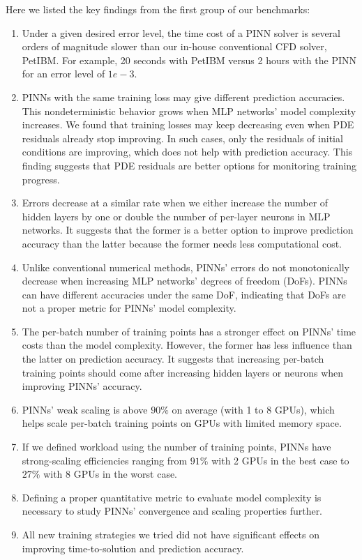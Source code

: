 {Here we listed the key findings from the first group of our benchmarks:
\begin{enumerate}[nolistsep]
    \item Under a given desired error level, the time cost of a PINN solver is several orders of magnitude slower than our in-house conventional CFD solver, PetIBM.
    For example, 20 seconds with PetIBM versus 2 hours with the PINN for an error level of $1e-3$.
    \item PINNs with the same training loss may give different prediction accuracies.
    This nondeterministic behavior grows when MLP networks' model complexity increases.
    We found that training losses may keep decreasing even when PDE residuals already stop improving.
    In such cases, only the residuals of initial conditions are improving, which does not help with prediction accuracy.
    This finding suggests that PDE residuals are better options for monitoring training progress.
    \item Errors decrease at a similar rate when we either increase the number of hidden layers by one or double the number of per-layer neurons in MLP networks.
    It suggests that the former is a better option to improve prediction accuracy than the latter because the former needs less computational cost.
    \item Unlike conventional numerical methods, PINNs' errors do not monotonically decrease when increasing MLP networks' degrees of freedom (DoFs).
    PINNs can have different accuracies under the same DoF, indicating that DoFs are not a proper metric for PINNs' model complexity.
    \item The per-batch number of training points has a stronger effect on PINNs' time costs than the model complexity. However, the former has less influence than the latter on prediction accuracy.
    It suggests that increasing per-batch training points should come after increasing hidden layers or neurons when improving PINNs' accuracy.
    \item PINNs' weak scaling is above $90\%$ on average (with 1 to 8 GPUs), which helps scale per-batch training points on GPUs with limited memory space.
    \item If we defined workload using the number of training points, PINNs have strong-scaling efficiencies ranging from $91\%$ with 2 GPUs in the best case to $27\%$ with 8 GPUs in the worst case.
    \item Defining a proper quantitative metric to evaluate model complexity is necessary to study PINNs' convergence and scaling properties further.
    \item All new training strategies we tried did not have significant effects on improving time-to-solution and prediction accuracy.
\end{enumerate}

}
